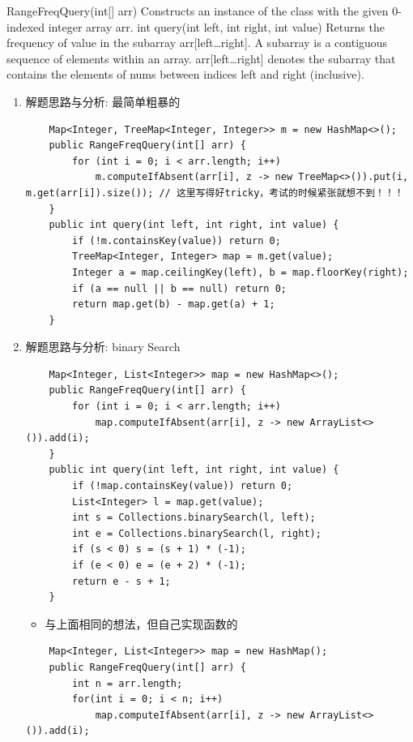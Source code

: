 \documentclass[9pt, b5paaper]{book}
\begin{document}
RangeFreqQuery(int[] arr) Constructs an instance of the class with the given 0-indexed integer array arr.
int query(int left, int right, int value) Returns the frequency of value in the subarray arr[left\ldots{}right].
A subarray is a contiguous sequence of elements within an array. arr[left\ldots{}right] denotes the subarray that contains the elements of nums between indices left and right (inclusive).
\begin{enumerate}
\item 解题思路与分析: 最简单粗暴的
\label{sec-7-0-5-1}
\begin{verbatim}
    Map<Integer, TreeMap<Integer, Integer>> m = new HashMap<>();
    public RangeFreqQuery(int[] arr) {
        for (int i = 0; i < arr.length; i++) 
            m.computeIfAbsent(arr[i], z -> new TreeMap<>()).put(i, m.get(arr[i]).size()); // 这里写得好tricky，考试的时候紧张就想不到！！！
    }
    public int query(int left, int right, int value) {
        if (!m.containsKey(value)) return 0;
        TreeMap<Integer, Integer> map = m.get(value);
        Integer a = map.ceilingKey(left), b = map.floorKey(right);
        if (a == null || b == null) return 0;
        return map.get(b) - map.get(a) + 1;
    }
\end{verbatim}
\item 解题思路与分析: binary Search
\label{sec-7-0-5-2}
\begin{verbatim}
    Map<Integer, List<Integer>> map = new HashMap<>();
    public RangeFreqQuery(int[] arr) {
        for (int i = 0; i < arr.length; i++) 
            map.computeIfAbsent(arr[i], z -> new ArrayList<>()).add(i);
    }
    public int query(int left, int right, int value) {
        if (!map.containsKey(value)) return 0;
        List<Integer> l = map.get(value);
        int s = Collections.binarySearch(l, left);
        int e = Collections.binarySearch(l, right);
        if (s < 0) s = (s + 1) * (-1);
        if (e < 0) e = (e + 2) * (-1);
        return e - s + 1;
    }
\end{verbatim}
\begin{itemize}
\item 与上面相同的想法，但自己实现函数的
\end{itemize}
\begin{verbatim}
    Map<Integer, List<Integer>> map = new HashMap();
    public RangeFreqQuery(int[] arr) {
        int n = arr.length;
        for(int i = 0; i < n; i++)
            map.computeIfAbsent(arr[i], z -> new ArrayList<>()).add(i);

\end{verbatim}
\end{enumerate}
\end{document}
